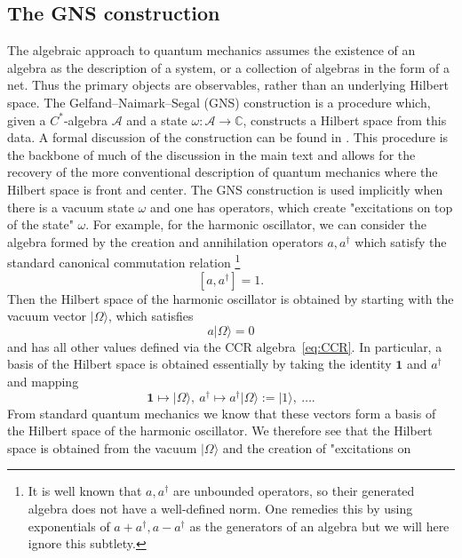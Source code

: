 \documentclass[aps,pra,reprint,superscriptaddress]{revtex4-2}
\newcommand{\cA}{{\mathcal A}}
\newcommand\w{\omega}
\newcommand\W{\Omega}
\newcommand{\id}{\mathbf 1}
\providecommand{\ket}[1]{\lvert #1\rangle}
\theoremstyle{definition}
\theoremstyle{remark}
\begin{document}
\subsection{The GNS construction}\label{app:GNS}
The algebraic approach to quantum mechanics assumes the existence of an algebra
as the description of a system, or a collection of algebras in the form of a net. Thus the
primary objects are observables, rather than an underlying Hilbert space. The
Gelfand--Naimark--Segal (GNS) construction is a procedure which, given a
$C^\ast$-algebra $\cA$ and a state $\w: \cA \rightarrow \mathbb{C}$,
constructs a Hilbert space from this data. A formal discussion of the construction can be found in 
\cite[II.6.4]{Blackadar}. This procedure is the backbone of
much of the discussion in the main text and allows for the recovery of the more
conventional description of quantum mechanics where the Hilbert space is front
and center.
The GNS construction is used implicitly when there is a vacuum
state $\w$ and one has operators, which create "excitations on top of the
state" $\w$. For example, for the harmonic oscillator, we can consider the
algebra formed by the creation and annihilation operators $a, a^\dagger$ which
satisfy the standard canonical commutation relation \footnote{It is well known
    that $a,a^\dagger$ are unbounded operators, so their generated algebra does
    not have a well-defined norm. One remedies this by using exponentials of $a
    + a^\dagger, a- a^\dagger$ as the generators of an algebra but we will here
ignore this subtlety.}
\begin{equation}\label{eq:CCR}
    [a,a^\dagger] = 1.
\end{equation}
Then the Hilbert space of the harmonic oscillator is obtained by starting with
the vacuum vector $\ket{\W}$, which satisfies 
\begin{equation}
    a \ket{\W} = 0
\end{equation}
and has all other values defined via the CCR algebra~\eqref{eq:CCR}. In
particular, a basis of the Hilbert space is obtained essentially by taking the
identity $\id$ and $a^\dagger$ and mapping
\begin{equation}
    \id \mapsto \ket{\W},\  a^\dagger \mapsto a^\dagger \ket{\W} := \ket{1},\
    \hdots.
\end{equation}
From standard quantum mechanics we know that these vectors form a basis of the Hilbert
space of the harmonic oscillator.
We therefore see that the Hilbert space is obtained from the vacuum $\ket{\W}$ and the creation of "excitations on
\end{document}
